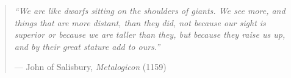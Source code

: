 

\begin{quotation}
    \textit{
        ``We are like dwarfs sitting on the shoulders of giants.
        We see more, and things that are more distant, than they did, not because our sight is superior or because we are taller than they, but because they raise us up, and by their great stature add to ours.''
    }
    \begin{flushright}
        --- John of Salisbury, \emph{Metalogicon} (1159)
    \end{flushright}
\end{quotation}